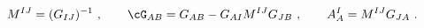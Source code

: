 \begin{equation} \label{M}
  M^{IJ} = (G_{IJ})^{-1}\ ,\qquad \cG_{AB} = G_{AB} - G_{ AI} M^{IJ}
  G_{JB}\ ,\qquad  A_A^I = M^{IJ} G_{JA}\ .
 \end{equation}

